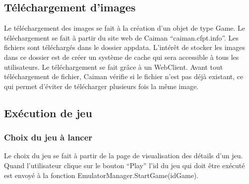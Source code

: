 \documentclass[a4paper,12pt,french]{sphinxmanual}
\begin{document}
\subsection{Téléchargement d’images}
\label{\detokenize{organique:telechargement-dimages}}
\sphinxAtStartPar
Le téléchargement des images se fait à la création d’un objet de type Game. Le téléchargement se fait à partir du site web de Caiman “caiman.cfpt.info”. Les fichiers sont téléchargés dans le dossier appdata. L’intérêt de stocker les images dans ce dossier est de créer un système de cache qui sera accessible à tous les utilisateurs.  Le téléchargement se fait grâce à un WebClient. Avant tout téléchargement de fichier, Caiman vérifie si le fichier n’est pas déjà existant, ce qui permet d’éviter de télécharger plusieurs fois la même image.

\begin{sphinxVerbatim}[commandchars=\\\{\}]
  

               
                     
                          
\end{sphinxVerbatim}


\subsection{Exécution de jeu}
\label{\detokenize{organique:execution-de-jeu}}

\subsubsection{Choix du jeu à lancer}
\label{\detokenize{organique:choix-du-jeu-a-lancer}}
\sphinxAtStartPar
Le choix du jeu se fait à partir de la page de visualisation des détails d’un jeu. Quand l’utilisateur clique sur le bouton “Play” l’id du jeu qui doit être exécuté est envoyé à la fonction EmulatorManager.StartGame(idGame).
\end{document}
